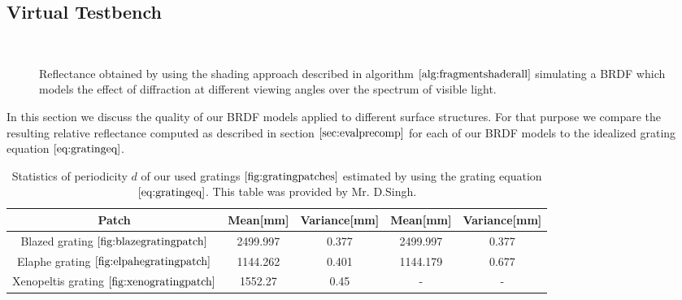 \subsection{Virtual Testbench}
\label{sec:virtualtestbench}
\begin{figure}[H]
  \centering
~
  

\caption[Validation of FLSS Approach applied on our Gratings]{Reflectance obtained by using the shading approach described in algorithm $\ref{alg:fragmentshaderall}$ simulating a BRDF which models the effect of diffraction at different viewing angles over the spectrum of visible light.}
\label{fig:evaluationdiffshaderalllambda}
\end{figure}

In this section we discuss the quality of our BRDF models applied to different surface structures. For that purpose we compare the resulting relative reflectance computed as described in section $\ref{sec:evalprecomp}$ for each of our BRDF models to the idealized grating equation $\ref{eq:gratingeq}$. 

\begin{table}[H]
  \centering
  \begin{tabular}{| c | c | c | c | c | }
    \hline                       
    Patch & Mean[mm] & Variance[mm] & Mean[mm] & Variance[mm] \\
    \hline
    Blazed grating $\ref{fig:blazegratingpatch}$ & 2499.997 & 0.377 & 2499.997 & 0.377 \\
    Elaphe grating $\ref{fig:elpahegratingpatch}$ & 1144.262 & 0.401 & 1144.179 & 0.677\\
    Xenopeltis grating $\ref{fig:xenogratingpatch}$ & 1552.27 & 0.45 & - & - \\
    \hline  
  \end{tabular}
\caption[Estimated Grating Spacings]{Statistics of periodicity $d$ of our used gratings $\ref{fig:gratingpatches}$ estimated by using the grating equation $\ref{eq:gratingeq}$. This table was provided by Mr. D.Singh.}
\label{tab:gratingsmeanvariance}
\end{table}

